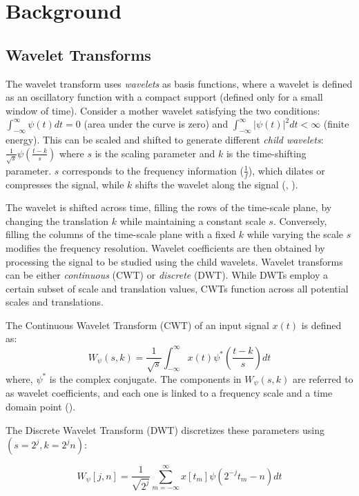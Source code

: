 \section{Background}
\label{sec:background}
\subsection{Wavelet Transforms}
\label{sec:wt}
The wavelet transform uses {\em wavelets} as basis functions, where a wavelet is defined as an oscillatory function with
a compact support (defined only for a small window of time).  Consider a mother wavelet satisfying the two conditions:
$\int_{-\infty}^{\infty} \psi(t)dt=0$ (area under the curve is zero) and $\int_{-\infty}^{\infty} |\psi(t)|^2dt < \infty
$ (finite energy). This can be scaled and shifted to generate different {\em child wavelets}: $\frac{1}{\sqrt{s}}
\psi(\frac{t-k}{s})$ where $s$ is the scaling parameter and $k$ is the time-shifting parameter. $s$
corresponds to the frequency information ($\frac{1}{f}$), which dilates or compresses the signal, while $k$ shifts
the wavelet along the signal (\cite{dwt-psi}, \cite{dwt-eq}).

The wavelet is shifted across time, filling the rows of the time-scale plane, by changing the translation $k$ while maintaining a constant scale $s$. Conversely, filling the columns of the time-scale plane with a fixed $k$ while varying the scale $s$ modifies the frequency resolution. Wavelet coefficients are then obtained by processing the signal to be studied using the child wavelets. Wavelet transforms can be either {\em continuous} (CWT) or {\em discrete} (DWT).  While DWTs employ a certain subset of scale and translation values, CWTs function across all potential scales and translations.

The Continuous Wavelet Transform (CWT) of an input signal $x(t)$ is defined as:
\begin{equation}
    W_{\psi}(s,k) = \frac{1}{\sqrt{s}} \int_{-\infty}^{\infty} x(t)  \psi^{*} \left( \frac{t-k}{s} \right) dt
\end{equation}
where, $\psi^*$ is the complex conjugate. The components in $W_{\psi}(s,k)$ are referred to as wavelet coefficients, and each one is linked to a frequency scale and a time domain point (\cite{wavelet-theory}). 

The Discrete Wavelet Transform (DWT)  discretizes these parameters using $(s=2^j, k=2^jn)$:

\begin{equation}
    W_{\psi}[j,n] = \frac{1}{\sqrt{2^j}} \sum_{m=-\infty}^{\infty} x[t_m]  \psi \left(2^{-j}t_m-n \right) dt
\end{equation}

